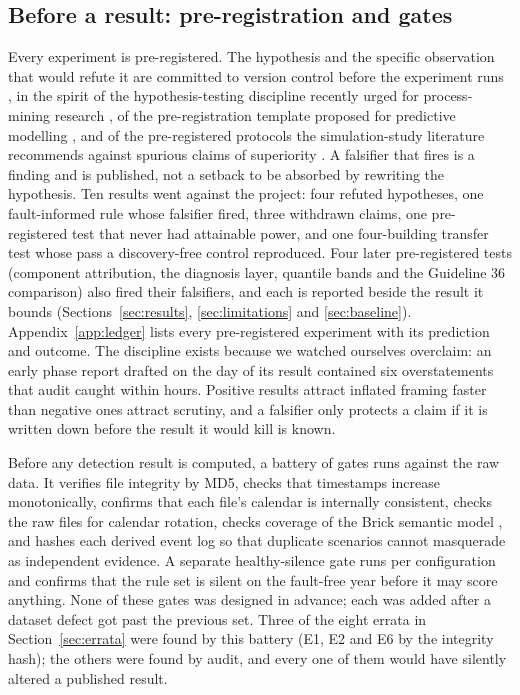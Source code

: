 \documentclass[11pt,letterpaper]{article}
\begin{document}
\subsection{Before a result: pre-registration and gates}

Every experiment is pre-registered. The hypothesis and the specific observation that would refute it are committed to version control before the experiment runs \cite{nosek2018preregistration}, in the spirit of the hypothesis-testing discipline recently urged for process-mining research \cite{pitsch2025hypothesistesting}, of the pre-registration template proposed for predictive modelling \cite{hofman2023preregistration}, and of the pre-registered protocols the simulation-study literature recommends against spurious claims of superiority \cite{pawel2022pitfalls}. A falsifier that fires is a finding and is published, not a setback to be absorbed by rewriting the hypothesis. Ten results went against the project: four refuted hypotheses, one fault-informed rule whose falsifier fired, three withdrawn claims, one pre-registered test that never had attainable power, and one four-building transfer test whose pass a discovery-free control reproduced. Four later pre-registered tests (component attribution, the diagnosis layer, quantile bands and the Guideline 36 comparison) also fired their falsifiers, and each is reported beside the result it bounds (Sections~\ref{sec:results}, \ref{sec:limitations} and \ref{sec:baseline}). Appendix~\ref{app:ledger} lists every pre-registered experiment with its prediction and outcome. The discipline exists because we watched ourselves overclaim: an early phase report drafted on the day of its result contained six overstatements that audit caught within hours. Positive results attract inflated framing faster than negative ones attract scrutiny, and a falsifier only protects a claim if it is written down before the result it would kill is known.

Before any detection result is computed, a battery of gates runs against the raw data. It verifies file integrity by MD5, checks that timestamps increase monotonically, confirms that each file's calendar is internally consistent, checks the raw files for calendar rotation, checks coverage of the Brick semantic model \cite{balaji2016brick}, and hashes each derived event log so that duplicate scenarios cannot masquerade as independent evidence. A separate healthy-silence gate runs per configuration and confirms that the rule set is silent on the fault-free year before it may score anything. None of these gates was designed in advance; each was added after a dataset defect got past the previous set. Three of the eight errata in Section~\ref{sec:errata} were found by this battery (E1, E2 and E6 by the integrity hash); the others were found by audit, and every one of them would have silently altered a published result.
\end{document}
